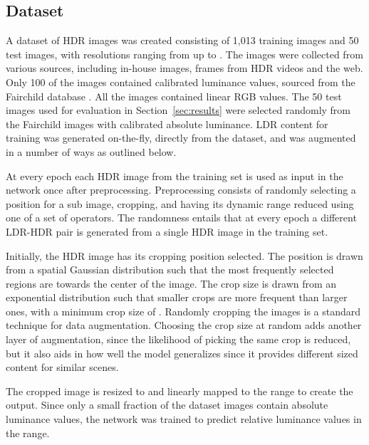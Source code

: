\documentclass{egpubl}
\begin{document}
\subsection{\textbf{Dataset}}\label{sec:dataset}

A dataset of HDR images was created consisting of 1,013 training images and 50
test images, with resolutions ranging from  up to
. The images were collected from various sources, including
in-house images, frames from HDR videos and the web. Only 100 of the images
contained calibrated luminance values, sourced from the Fairchild database
\cite{fairchild2007hdr}. All the images contained linear RGB values. The 50
test images used for evaluation in Section~\ref{sec:results} were selected
randomly from the Fairchild images with calibrated absolute luminance. LDR
content for training was generated on-the-fly, directly from the dataset, and
was augmented in a number of ways as outlined below.

At every epoch each HDR image from the training set is used as input in the
network once after preprocessing. Preprocessing consists of randomly selecting
a position for a sub image, cropping, and having its dynamic range reduced
using one of a set of operators. The randomness entails that at every epoch a
different LDR-HDR pair is generated from a single HDR image in the training
set.

Initially, the HDR image has its cropping position selected. The position is drawn from a spatial Gaussian distribution such that the most frequently
selected regions are towards the center of the image. The crop size is drawn from an exponential distribution such that smaller crops are more
frequent than larger ones, with a minimum crop size of . Randomly cropping the images is a standard technique for data augmentation.
Choosing the crop size at random adds another layer of augmentation, since the likelihood of picking the same crop is reduced, but it also aids in
how well the model generalizes since it provides different sized content for similar scenes.

The cropped image is resized to  and linearly mapped to the
 range to create the output. Since only a small fraction of the dataset
images contain absolute luminance values, the network was trained to predict
relative luminance values in the  range.
\end{document}
